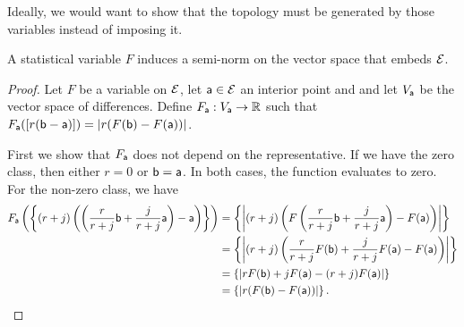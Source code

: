 \begin{remark}
	Ideally, we would want to show that the topology must be generated by those variables instead of imposing it.
\end{remark}

\begin{prop}
	A statistical variable $F$ induces a semi-norm on the vector space that embeds $\Ens$.
\end{prop}

\begin{proof}
	Let $F$ be a variable on $\Ens$, let $\ens[a] \in \Ens$ an interior point and and let $V_{\ens[a]}$ be the vector space of differences. Define $F_{\ens[a]} : V_{\ens[a]} \to \mathbb{R}$ such that $F_{\ens[a]}([r(\ens[b]-\ens[a])]) = |r (F(\ens[b]) - F(\ens[a]))|$.
	
	First we show that $F_{\ens[a]}$ does not depend on the representative. If we have the zero class, then either $r=0$ or $\ens[b] = \ens[a]$. In both cases, the function evaluates to zero. For the non-zero class, we have
	\begin{equation}
		\begin{aligned}
			F_{\ens[a]}\left(\left\{(r+j)\left(\left(\frac{r}{r+j}\ens[b] +\frac{j}{r+j} \ens[a]\right) -\ens[a]\right)\right\}\right) &= \left\{ \left|(r+j)\left(F\left(\frac{r}{r+j}\ens[b] +\frac{j}{r+j} \ens[a]\right) - F(\ens[a]) \right)\right| \right\} \\
			&= \left\{ \left|(r+j)\left(\frac{r}{r+j}F(\ens[b]) +\frac{j}{r+j} F(\ens[a]) - F(\ens[a]) \right)\right| \right\} \\
			&= \left\{ \left| r F(\ens[b]) + j F(\ens[a]) - (r+j) F(\ens[a]) \right| \right\} \\
			&= \left\{|r (F(\ens[b]) - F(\ens[a]))|\right\}.
		\end{aligned}
	\end{equation}
	

\end{proof}
